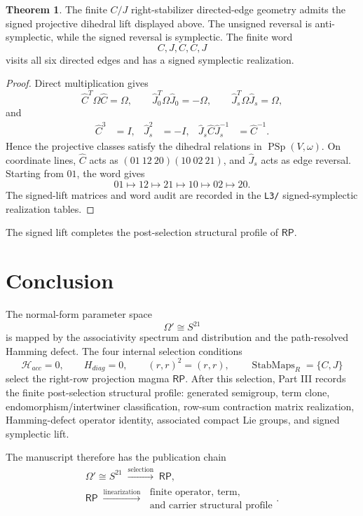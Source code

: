 \documentclass[11pt]{article}
\theoremstyle{definition}
\newtheorem{theorem}{Theorem}[section]
\newcommand{\RP}{\mathsf{RP}}
\begin{document}
\begin{theorem}
\label{thm:20.1}
The finite \(C/J\) right-stabilizer directed-edge geometry admits the signed
projective dihedral lift displayed above.  The unsigned reversal is
anti-symplectic, while the signed reversal is symplectic.  The finite word
\[
C,J,C,C,J
\]
visits all six directed edges and has a signed symplectic realization.
\end{theorem}

\begin{proof}
Direct multiplication gives
\[
\widehat C^T\Omega\widehat C=\Omega,
\qquad
\widehat J_0^T\Omega\widehat J_0=-\Omega,
\qquad
\widehat J_s^T\Omega\widehat J_s=\Omega,
\]
and
\[
\begin{aligned}
\widehat C^3&=I,
&
\widehat J_s^2&=-I,
&
\widehat J_s\widehat C\widehat J_s^{-1}&=\widehat C^{-1}.
\end{aligned}
\]
Hence the projective classes satisfy the dihedral relations in
\(\operatorname{PSp}(V,\omega)\).  On coordinate lines, \(\widehat C\) acts as
\((01\ 12\ 20)(10\ 02\ 21)\), and \(\widehat J_s\) acts as edge reversal.
Starting from \(01\), the word gives
\[
01\mapsto12\mapsto21\mapsto10\mapsto02\mapsto20.
\]
The signed-lift matrices and word audit are recorded in the \texttt{L3/}
signed-symplectic realization tables.
\end{proof}

The signed lift completes the post-selection structural profile of \(\RP\).


\section{Conclusion}\label{conclusion}

The normal-form parameter space
\[
\Omega'\cong S^{21}
\]
is mapped by the associativity spectrum and distribution and the path-resolved Hamming defect.  The four
internal selection conditions
\[
\mathcal H_{acc}=0,
\qquad
H_{diag}=0,
\qquad
(r,r)^2=(r,r),
\qquad
\operatorname{StabMaps}_{R}=\{C,J\}
\]
select the right-row projection magma \(\RP\).  After this selection, Part III
records the finite post-selection structural profile: generated semigroup, term clone,
endomorphism/intertwiner classification, row-sum contraction matrix realization,
Hamming-defect operator identity, associated compact Lie groups, and
signed symplectic lift.

The manuscript therefore has the publication chain
\[
\begin{gathered}
\Omega'\cong S^{21}
\;\xrightarrow{\text{selection}}\;
\RP,
\\[1mm]
\RP
\;\xrightarrow{\text{linearization}}\;
\begin{matrix}
\text{finite operator, term,}\\
\text{and carrier structural profile}
\end{matrix}.
\end{gathered}
\]
\end{document}
